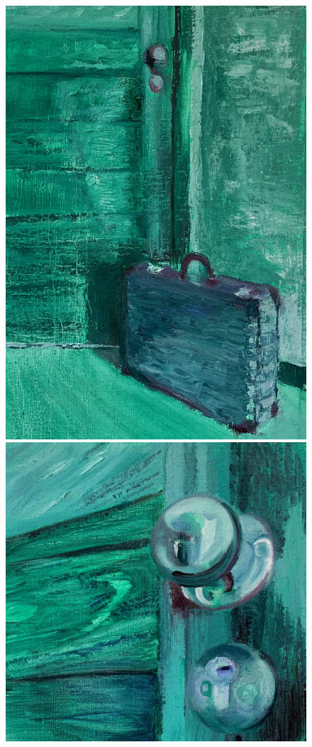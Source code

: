 \begin{figure}
  \begin{minipage}[b]{.475\linewidth}
	\caption{}%
	\label{boudet-eu-quero-ir-2020}

	\includegraphics[width=.8\linewidth]{figuras/boudet-eu-queri-ir-2020.pdf.compressed.pdf}
\end{minipage}\hfill
\begin{minipage}[b]{.475\linewidth}
	\caption{}%
	\label{boudet-contre-plogee-2020}

	\includegraphics[width=.8\linewidth]{figuras/boudet-contre-plogee2020.pdf.compressed.pdf}
\end{minipage}
\end{figure}

